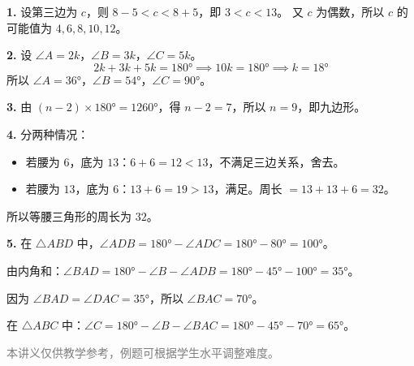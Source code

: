 \documentclass[12pt, a4paper]{ctexart}
\begin{document}
\begin{knowledgebox}[参考答案]
\textbf{1.} 设第三边为 $c$，则 $8 - 5 < c < 8 + 5$，即 $3 < c < 13$。
又 $c$ 为偶数，所以 $c$ 的可能值为 $4, 6, 8, 10, 12$。

\medskip

\textbf{2.} 设 $\angle A = 2k$，$\angle B = 3k$，$\angle C = 5k$。
\[
2k + 3k + 5k = 180° \implies 10k = 180° \implies k = 18°
\]
所以 $\angle A = 36°$，$\angle B = 54°$，$\angle C = 90°$。

\medskip

\textbf{3.} 由 $(n - 2) \times 180° = 1260°$，得 $n - 2 = 7$，所以 $n = 9$，即九边形。

\medskip

\textbf{4.} 分两种情况：
\begin{itemize}[nosep]
  \item 若腰为 $6$，底为 $13$：$6 + 6 = 12 < 13$，不满足三边关系，舍去。
  \item 若腰为 $13$，底为 $6$：$13 + 6 = 19 > 13$，满足。周长 $= 13 + 13 + 6 = 32$。
\end{itemize}
所以等腰三角形的周长为 $32$。

\medskip

\textbf{5.} 在 $\triangle ABD$ 中，$\angle ADB = 180° - \angle ADC = 180° - 80° = 100°$。

由内角和：$\angle BAD = 180° - \angle B - \angle ADB = 180° - 45° - 100° = 35°$。

因为 $\angle BAD = \angle DAC = 35°$，所以 $\angle BAC = 70°$。

在 $\triangle ABC$ 中：$\angle C = 180° - \angle B - \angle BAC = 180° - 45° - 70° = 65°$。
\end{knowledgebox}

\vfill
\begin{center}
\small\textcolor{gray}{本讲义仅供教学参考，例题可根据学生水平调整难度。}
\end{center}
\end{document}

